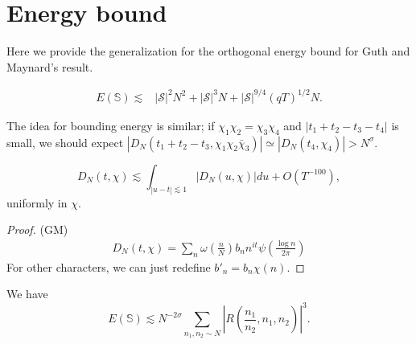 
\section{Energy bound}
Here we provide the generalization for the orthogonal energy bound for Guth and Maynard's result. 
\begin{proposition}
    \begin{align*}
        E(\mathbb{S})
        \lesssim& |\mathcal{S}|^2N^2+ |\mathcal{S}|^3N + |\mathcal{S}|^{9/4}(qT)^{1/2}N.
    \end{align*}
\end{proposition}
The idea for bounding energy is similar; if $\chi_1\chi_2=\chi_3\chi_4$ and $|t_1+t_2-t_3-t_4|$ is small, we should expect $|D_N(t_1+t_2-t_3,\chi_1\chi_2\bar{\chi}_3)|\simeq |D_N(t_4,\chi_4)|>N^\sigma$.
\begin{lemma}
    \[
    D_N(t,\chi)\lesssim \int_{|u-t|\lesssim 1} |D_N(u,\chi)|du + O(T^{-100}),
    \]
    uniformly in $\chi$.
\end{lemma}
\begin{proof}
    (GM)
    \begin{align*}
        D_N(t,\chi)=\sum_n \omega\left(\frac{n}{N}\right) b_n n^{it} \psi\left(\frac{\log n}{2\pi}\right)
    \end{align*}
    For other characters, we can just redefine $b'_n=b_n\chi(n)$.
\end{proof}
\begin{lemma} We have \[
    E(\mathbb{S})\lesssim N^{-2\sigma}\sum_{n_1,n_2\sim N}\left|R\left(\frac{n_1}{n_2},n_1,n_2\right) \right|^3.
    \]
    
\end{lemma}
